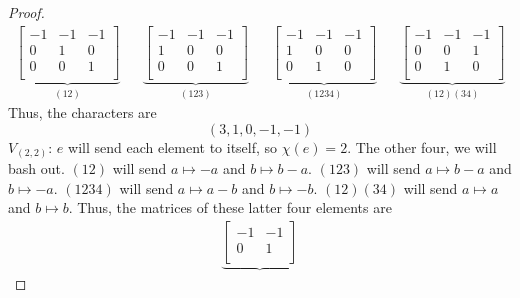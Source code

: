 \documentclass[../psets.tex]{subfiles}
\begin{document}
\begin{enumerate}
\begin{proof}
        \begin{align*}
            \underbrace{
                \begin{bmatrix}
                    -1 & -1 & -1\\
                    0 & 1 & 0\\
                    0 & 0 & 1\\
                \end{bmatrix}
            }_{(12)}&&
            \underbrace{
                \begin{bmatrix}
                    -1 & -1 & -1\\
                    1 & 0 & 0\\
                    0 & 0 & 1\\
                \end{bmatrix}
            }_{(123)}&&
            \underbrace{
                \begin{bmatrix}
                    -1 & -1 & -1\\
                    1 & 0 & 0\\
                    0 & 1 & 0\\
                \end{bmatrix}
            }_{(1234)}&&
            \underbrace{
                \begin{bmatrix}
                    -1 & -1 & -1\\
                    0 & 0 & 1\\
                    0 & 1 & 0\\
                \end{bmatrix}
            }_{(12)(34)}
        \end{align*}
        Thus, the characters are
        \begin{equation*}
            (3,1,0,-1,-1)
        \end{equation*}
        \underline{$V_{(2,2)}$}: $e$ will send each element to itself, so $\chi(e)=2$. The other four, we will bash out. $(12)$ will send $a\mapsto -a$ and $b\mapsto b-a$. $(123)$ will send $a\mapsto b-a$ and $b\mapsto -a$. $(1234)$ will send $a\mapsto a-b$ and $b\mapsto -b$. $(12)(34)$ will send $a\mapsto a$ and $b\mapsto b$. Thus, the matrices of these latter four elements are
        \begin{align*}
            \underbrace{
                \begin{bmatrix}
                    -1 & -1\\
                    0 & 1\\

\end{bmatrix}}
\end{align*}
\end{proof}
\end{enumerate}
\end{document}
